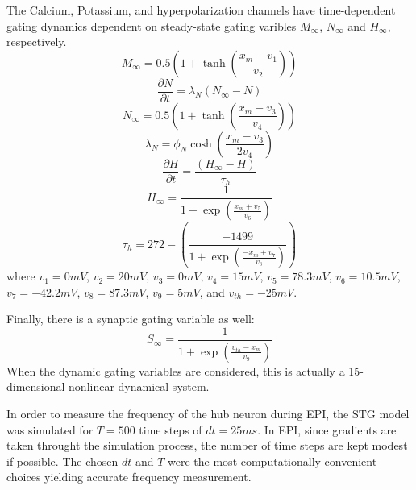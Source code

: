 \documentclass[11pt]{article}
\begin{document}
The Calcium, Potassium, and hyperpolarization channels have time-dependent gating dynamics dependent on steady-state gating varibles $M_\infty$, $N_\infty$ and $H_\infty$, respectively.
\begin{equation}  M_{\infty} = 0.5 \left( 1 + \tanh \left( \frac{x_m - v_1}{v_2} \right) \right) \end{equation}
\begin{equation}  \frac{\partial N}{\partial t} = \lambda_N (N_\infty - N)  \end{equation}
\begin{equation}  N_\infty = 0.5 \left( 1 + \tanh \left( \frac{x_m - v_3}{v_4} \right) \right) \end{equation}
\begin{equation}  \lambda_N = \phi_N \cosh \left( \frac{x_m - v_3}{2 v_4} \right) \end{equation}
\begin{equation}  \frac{\partial H}{\partial t} = \frac{\left( H_\infty - H \right)}{\tau_h} \end{equation}
\begin{equation}  H_\infty = \frac{1}{1 + \exp \left( \frac{x_m + v_5}{v_6} \right)} \end{equation}
\begin{equation}  \tau_h = 272 - \left( \frac{-1499}{1 + \exp \left( \frac{-x_m + v_7}{v_8} \right)} \right) \end{equation}
where $v_1 = 0mV$, $v_2  = 20mV$, $v_3 = 0mV$, $v_4 = 15mV$, $v_5 = 78.3mV$,
$v_6 = 10.5mV$, $v_7 = -42.2mV$, $v_8 = 87.3mV$, $v_9 = 5mV$, and $v_{th} = -25mV$.

Finally, there is a synaptic gating variable as well:
\begin{equation} S_\infty = \frac{1}{1 + \exp \left( \frac{v_{th} - x_m}{v_9} \right)} 
\end{equation}
When the dynamic gating variables are considered, this is actually a 15-dimensional nonlinear dynamical system.

In order to measure the frequency of the hub neuron during EPI, the STG model was simulated for $T = 500$ time steps of $dt = 25ms$.  In EPI, since gradients are taken throught the simulation process, the number of time steps are kept modest if possible. The chosen $dt$ and $T$ were the most computationally convenient choices yielding accurate frequency measurement.
\end{document}
